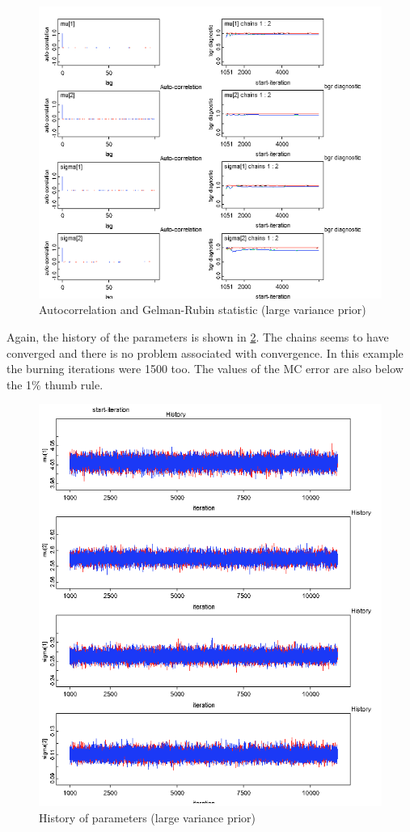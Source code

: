 \documentclass{article}
\begin{document}
\begin{figure}[ht!]
  \centering
  \includegraphics[width=1\textwidth]{imgs/Inf_high.png}
  \caption{Autocorrelation and Gelman-Rubin statistic (large variance prior)}
  \label{fig:fig11}
\end{figure}

\pagebreak


Again, the history of the parameters is shown in \cref{fig:fig12}. The chains seems to have converged and there is no problem associated with convergence. In this example the burning iterations were 1500 too. The values of the MC error are also below the 1\% thumb rule.

\begin{figure}[ht!]
  \centering
  \includegraphics[width=.8\textwidth]{imgs/Inf_high_hist.png}
  \caption{History of parameters (large variance prior)}
  \label{fig:fig12}
\end{figure}
\end{document}
